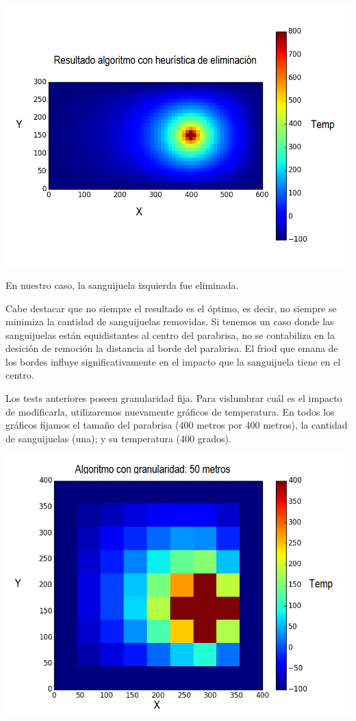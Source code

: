 	\begin{center}
		\includegraphics[scale=0.5]{./img/test6_conkill.png}
	\end{center}

	En nuestro caso, la sanguijuela izquierda fue eliminada.

	Cabe destacar que no siempre el resultado es el óptimo, es decir, no siempre se minimiza la cantidad de sanguijuelas removidas. Si tenemos un caso donde las sanguijuelas están equidistantes al centro del parabrisa, no se contabiliza en la desición de remoción la distancia al borde del parabrisa. El friod que emana de los bordes influye significativamente en el impacto que la sanguijuela tiene en el centro.

	Los tests anteriores poseen granularidad fija. Para vislumbrar cuál es el impacto de modificarla, utilizaremos nuevamente gráficos de temperatura. En todos los gráficos fijamos el tamaño del parabrisa (400 metros por 400 metros), la cantidad de sanguijuelas (una); y su temperatura (400 grados).

	\begin{center}
		\includegraphics[scale=0.5]{./img/granularidad/g50_t400_sinkill.png}
	\end{center}

